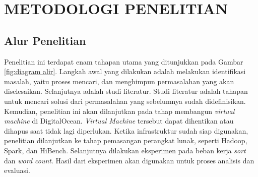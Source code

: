\chapter{METODOLOGI PENELITIAN}
%


\section{Alur Penelitian}
Penelitian ini terdapat enam tahapan utama yang ditunjukkan pada Gambar \ref{fig:diagram alir}. Langkah awal yang dilakukan adalah melakukan identifikasi masalah, yaitu proses mencari, dan menghimpun permasalahan yang akan diselesaikan. Selanjutnya adalah studi literatur. Studi literatur adalah tahapan untuk mencari solusi dari permasalahan yang sebelumnya sudah didefinisikan. Kemudian, penelitian ini akan dilanjutkan pada tahap membangun \textit{virtual machine} di DigitalOcean. \textit{Virtual Machine} tersebut dapat dihentikan atau dihapus  saat tidak lagi diperlukan. Ketika infrastruktur sudah siap digunakan, penelitian dilanjutkan ke tahap pemasangan perangkat lunak, seperti Hadoop, Spark, dan HiBench. Selanjutnya dilakukan eksperimen pada beban kerja \textit{sort} dan \textit{word count}. Hasil dari eksperimen akan digunakan untuk proses analisis dan evaluasi.
        
